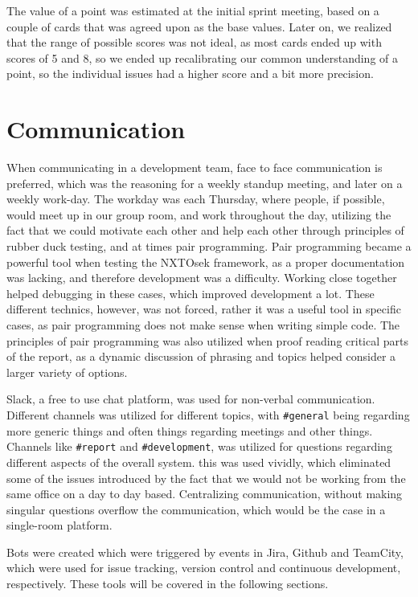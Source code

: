 The value of a point was estimated at the initial sprint meeting, based on a couple of cards that was agreed upon as the base values.
Later on, we realized that the range of possible scores was not ideal, as most cards ended up with scores of 5 and 8, so we ended up recalibrating our common understanding of a point, so the individual issues had a higher score and a bit more precision.




\section{Communication}
When communicating in a development team, face to face communication is preferred, which was the reasoning for a weekly standup meeting, and later on a weekly work-day.
The workday was each Thursday, where people, if possible, would meet up in our group room, and work throughout the day, utilizing the fact that we could motivate each other and help each other through principles of rubber duck testing, and at times pair programming. 
Pair programming became a powerful tool when testing the NXTOsek framework, as a proper documentation was lacking, and therefore development was a difficulty.
Working close together helped debugging in these cases, which improved development a lot.
These different technics, however, was not forced, rather it was a useful tool in specific cases, as pair programming does not make sense when writing simple code.
The principles of pair programming was also utilized when proof reading critical parts of the report, as a dynamic discussion of phrasing and topics helped consider a larger variety of options.


Slack, a free to use chat platform, was used for non-verbal communication. 
Different channels was utilized for different topics, with \texttt{\#general} being regarding more generic things and often things regarding meetings and other things.
Channels like \texttt{\#report} and \texttt{\#development}, was utilized for questions regarding different aspects of the overall system.
this was used vividly, which eliminated some of the issues introduced by the fact that we would not be working from the same office on a day to day based. 
Centralizing communication, without making singular questions overflow the communication, which would be the case in a single-room platform.
 
 
Bots were created which were triggered by events in Jira, Github and TeamCity, which were used for issue tracking, version control and continuous development, respectively.
These tools will be covered in the following sections.

